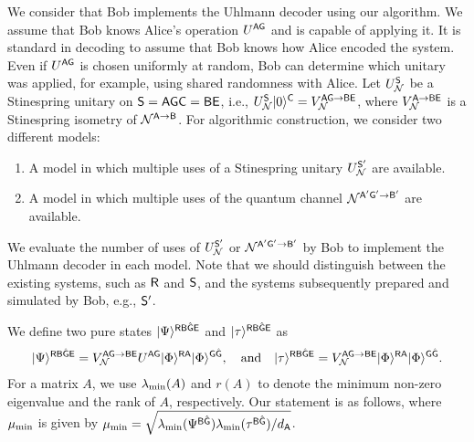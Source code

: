We consider that Bob implements the Uhlmann decoder using our algorithm.
We assume that Bob knows Alice's operation $U^{{\mathsf{A}}{\mathsf{G}}}$ and is capable of applying it.
It is standard in decoding to assume that Bob knows how Alice encoded the system.
Even if $U^{{\mathsf{A}}{\mathsf{G}}}$ is chosen uniformly at random, Bob can determine which unitary was applied, for example, using shared randomness with Alice.
Let $U_{\mathcal{N}}^{{\mathsf{S}}}$ be a Stinespring unitary on ${\mathsf{S}} = {\mathsf{A}}{\mathsf{G}}{\mathsf{C}} = {\mathsf{B}}{\mathsf{E}}$, i.e., $U_{\mathcal{N}}^{{\mathsf{S}}}|0\rangle^{{\mathsf{C}}} = V_{\mathcal{N}}^{{\mathsf{A}}{\mathsf{G}}\rightarrow{\mathsf{B}}{\mathsf{E}}}$, where $V_{\mathcal{N}}^{{\mathsf{A}} \to {\mathsf{B}}{\mathsf{E}}}$ is a Stinespring isometry of ${\mathcal{N}}^{{\mathsf{A}} \to {\mathsf{B}}}$.
For algorithmic construction, we consider two different models: 
\begin{enumerate}
    \item A model in which multiple uses of a Stinespring unitary $U_{\mathcal{N}}^{{\mathsf{S}}'}$ are available.
    \item A model in which multiple uses of the quantum channel ${\mathcal{N}}^{{\mathsf{A}}'{\mathsf{G}}' \to {\mathsf{B}}'}$ are available.
\end{enumerate}
We evaluate the number of uses of $U_{\mathcal{N}}^{{\mathsf{S}}'}$ or ${\mathcal{N}}^{{\mathsf{A}}'{\mathsf{G}}'\rightarrow{\mathsf{B}}'}$ by Bob to implement the Uhlmann decoder in each model.
Note that we should distinguish between the existing systems, such as ${\mathsf{R}}$ and ${\mathsf{S}}$, and the systems subsequently prepared and simulated by Bob, e.g., ${\mathsf{S}}'$.





We define two pure states $|\Psi\rangle^{{\mathsf{R}}{\mathsf{B}}\hat{{\mathsf{G}}}{\mathsf{E}}}$ and $|\tau\rangle^{{\mathsf{R}}{\mathsf{B}}\hat{{\mathsf{G}}}{\mathsf{E}}}$ as 
\begin{align}
    \ket{\Psi}^{\sR\sB\hat{\sG}\sE} = V_\cN^{\sA\sG\rarr\sB\sE} U^{\sA\sG} \ket{\Phi}^{\sR\sA}\ket{\Phi}^{\sG\hat{\sG}}, \ \ \ \text{and} \ \ \
    \ket{\tau}^{\sR\sB\hat{\sG}\sE} = V_\cN^{\sA\sG\rarr\sB\sE}\ket{\Phi}^{\sR\sA}\ket{\Phi}^{\sG\hat{\sG}}.
\end{align}
For a matrix $A$, we use $\lambda_{\rm min}(A)$ and $r(A)$ to denote the minimum non-zero eigenvalue and the rank of $A$, respectively.
Our statement is as follows, where $\mu_{\rm min}$ is given by $\mu_{\rm min} = \sqrt{\lambda_{\rm min}(\Psi^{{\mathsf{B}}\hat{{\mathsf{G}}}})\lambda_{\rm min}(\tau^{{\mathsf{B}}\hat{{\mathsf{G}}}})/d_{\mathsf{A}}}$.

